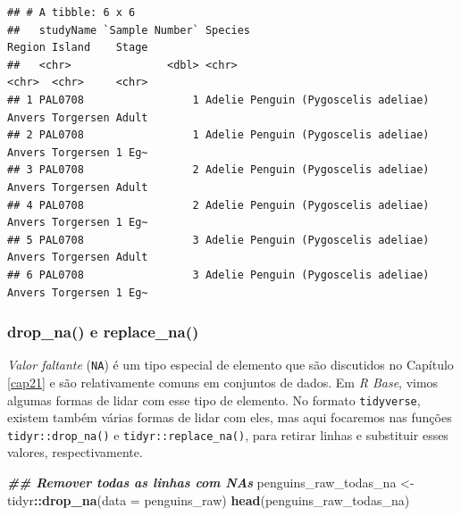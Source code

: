 \documentclass[
]{article}
\newenvironment{Shaded}{\begin{snugshade}}{\end{snugshade}}
\newcommand{\AttributeTok}[1]{\textcolor[rgb]{0.13,0.29,0.53}{#1}}
\newcommand{\DocumentationTok}[1]{\textcolor[rgb]{0.56,0.35,0.01}{\textbf{\textit{#1}}}}
\newcommand{\FunctionTok}[1]{\textcolor[rgb]{0.13,0.29,0.53}{\textbf{#1}}}
\newcommand{\NormalTok}[1]{#1}
\newcommand{\OtherTok}[1]{\textcolor[rgb]{0.56,0.35,0.01}{#1}}
\newcommand{\SpecialCharTok}[1]{\textcolor[rgb]{0.81,0.36,0.00}{\textbf{#1}}}
\begin{document}
\begin{verbatim}
## # A tibble: 6 x 6
##   studyName `Sample Number` Species                             Region Island    Stage
##   <chr>               <dbl> <chr>                               <chr>  <chr>     <chr>
## 1 PAL0708                 1 Adelie Penguin (Pygoscelis adeliae) Anvers Torgersen Adult
## 2 PAL0708                 1 Adelie Penguin (Pygoscelis adeliae) Anvers Torgersen 1 Eg~
## 3 PAL0708                 2 Adelie Penguin (Pygoscelis adeliae) Anvers Torgersen Adult
## 4 PAL0708                 2 Adelie Penguin (Pygoscelis adeliae) Anvers Torgersen 1 Eg~
## 5 PAL0708                 3 Adelie Penguin (Pygoscelis adeliae) Anvers Torgersen Adult
## 6 PAL0708                 3 Adelie Penguin (Pygoscelis adeliae) Anvers Torgersen 1 Eg~
\end{verbatim}

\hypertarget{drop_na-e-replace_na}{%
\subsubsection{drop\_na() e replace\_na()}\label{drop_na-e-replace_na}}

\emph{Valor faltante} (\texttt{NA}) é um tipo especial de elemento que são discutidos no Capítulo \ref{cap21} e são relativamente comuns em conjuntos de dados. Em \emph{R Base}, vimos algumas formas de lidar com esse tipo de elemento. No formato \texttt{tidyverse}, existem também várias formas de lidar com eles, mas aqui focaremos nas funções \texttt{tidyr::drop\_na()} e \texttt{tidyr::replace\_na()}, para retirar linhas e substituir esses valores, respectivamente.

\begin{Shaded}
\begin{Highlighting}[]
\DocumentationTok{\#\# Remover todas as linhas com NAs}
\NormalTok{penguins\_raw\_todas\_na }\OtherTok{\textless{}{-}}\NormalTok{ tidyr}\SpecialCharTok{::}\FunctionTok{drop\_na}\NormalTok{(}\AttributeTok{data =}\NormalTok{ penguins\_raw)}
\FunctionTok{head}\NormalTok{(penguins\_raw\_todas\_na)}
\end{Highlighting}
\end{Shaded}
\end{document}
